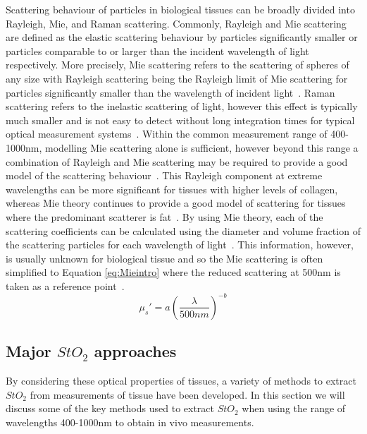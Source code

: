 Scattering behaviour of particles in biological tissues can be broadly divided into Rayleigh, Mie, and Raman scattering. Commonly, Rayleigh and Mie scattering are defined as the elastic scattering behaviour by particles significantly smaller or particles comparable to or larger than the incident wavelength of light respectively. More precisely, Mie scattering refers to the scattering of spheres of any size with Rayleigh scattering being the Rayleigh limit of Mie scattering for particles significantly smaller than the wavelength of incident light~\cite{Jacques2013}. Raman scattering refers to the inelastic scattering of light, however this effect is typically much smaller and is not easy to detect without long integration times for typical optical measurement systems~\citep{Kong2015}. Within the common measurement range of 400-1000nm, modelling Mie scattering alone is sufficient, however beyond this range a combination of Rayleigh and Mie scattering may be required to provide a good model of the scattering behaviour~\cite{Jacques2013}. This Rayleigh component at extreme wavelengths can be more significant for tissues with higher levels of collagen, whereas Mie theory continues to provide a good model of scattering for tissues where the predominant scatterer is fat~\cite{Jacques2013}. By using Mie theory, each of the scattering coefficients can be calculated using the diameter and volume fraction of the scattering particles for each wavelength of light~\citep{Hergert2012}. This information, however, is usually unknown for biological tissue and so the Mie scattering is often simplified to Equation \eqref{eq:Mieintro} where the reduced scattering at 500nm is taken as a reference point~\citep{Jacques2013}. 
\begin{equation}
    \mu_s' = a(\frac{\lambda}{500nm})^{-b}
    \label{eq:Mieintro}
\end{equation}

\subsection{Major $StO_2$ approaches}
By considering these optical properties of tissues, a variety of methods to extract $StO_2$ from measurements of tissue have been developed. In this section we will discuss some of the key methods used to extract $StO_2$ when using the range of wavelengths 400-1000nm to obtain in vivo measurements. 

